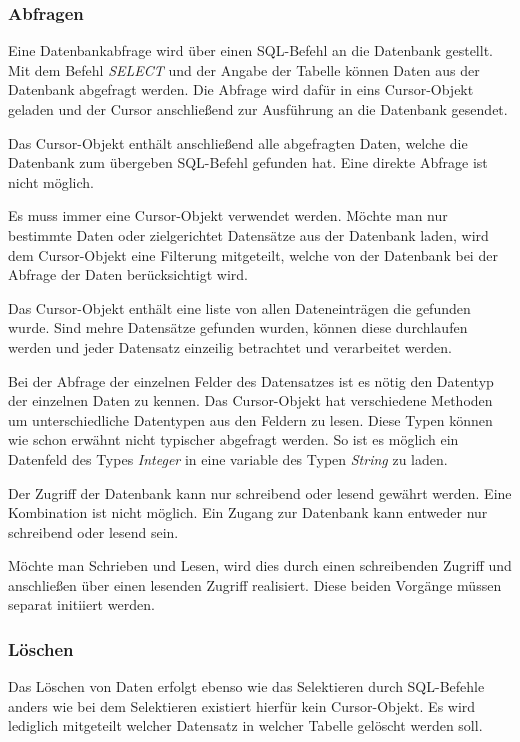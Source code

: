 \subsubsection{Abfragen}
Eine Datenbankabfrage wird über einen SQL-Befehl an die Datenbank gestellt. Mit dem Befehl \textit{SELECT} und der Angabe der Tabelle können Daten aus der Datenbank abgefragt werden. Die Abfrage wird dafür in eins Cursor-Objekt geladen und der Cursor anschließend zur Ausführung an die Datenbank gesendet.

Das Cursor-Objekt enthält anschließend alle abgefragten Daten, welche die Datenbank zum übergeben SQL-Befehl gefunden hat. Eine direkte Abfrage ist nicht möglich.

Es muss immer eine Cursor-Objekt verwendet werden. Möchte man nur bestimmte Daten oder zielgerichtet Datensätze aus der Datenbank laden, wird dem Cursor-Objekt eine Filterung mitgeteilt, welche von der Datenbank bei der Abfrage der Daten berücksichtigt wird.

Das Cursor-Objekt enthält eine liste von allen Dateneinträgen die gefunden wurde. Sind mehre Datensätze gefunden wurden, können diese durchlaufen werden und jeder Datensatz einzeilig betrachtet und verarbeitet werden.

Bei der Abfrage der einzelnen Felder des Datensatzes ist es nötig den Datentyp der einzelnen Daten zu kennen. Das Cursor-Objekt hat verschiedene Methoden um unterschiedliche Datentypen aus den Feldern zu lesen. Diese Typen können wie schon erwähnt nicht typischer abgefragt werden. So ist es möglich ein Datenfeld des Types \textit{Integer} in eine variable des Typen \textit{String} zu laden.

Der Zugriff der Datenbank kann nur schreibend oder lesend gewährt werden. Eine Kombination ist nicht möglich. Ein Zugang zur Datenbank kann entweder nur schreibend oder lesend sein.

Möchte man Schrieben und Lesen, wird dies durch einen schreibenden Zugriff und anschließen über einen lesenden Zugriff realisiert. Diese beiden Vorgänge müssen separat initiiert werden.

\subsubsection{Löschen}
Das Löschen von Daten erfolgt ebenso wie das Selektieren durch SQL-Befehle anders wie bei dem Selektieren existiert hierfür kein Cursor-Objekt. Es wird lediglich mitgeteilt welcher Datensatz in welcher Tabelle gelöscht werden soll.

